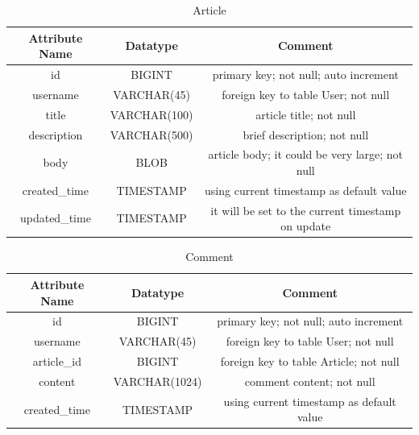 \documentclass[11pt]{homework}
\begin{document}
  \begin{table}[h!]
    \begin{center}
      \caption{Article}
      \label{tab:table2}
      \begin{tabular}{c|c|c} 
        \textbf{Attribute Name} & \textbf{Datatype} & \textbf{Comment}\\
        \hline
        id & BIGINT & primary key; not null; auto increment \\
        username & VARCHAR(45) & foreign key to table User; not null \\
        title & VARCHAR(100) & article title; not null \\
        description & VARCHAR(500) & brief description; not null \\
        body & BLOB & article body; it could be very large; not null \\
        created\_time & TIMESTAMP & using current timestamp as default value \\
        updated\_time & TIMESTAMP & it will be set to the current timestamp on update \\
      \end{tabular}
    \end{center}
  \end{table}

  \begin{table}[h!]
    \begin{center}
      \caption{Comment}
      \label{tab:table3}
      \begin{tabular}{c|c|c} %
        \textbf{Attribute Name} & \textbf{Datatype} & \textbf{Comment}\\
        \hline
        id & BIGINT & primary key; not null; auto increment \\
        username & VARCHAR(45) & foreign key to table User; not null \\
        article\_id & BIGINT & foreign key to table Article; not null \\
        content & VARCHAR(1024) & comment content; not null \\
        created\_time & TIMESTAMP & using current timestamp as default value \\
      \end{tabular}
    \end{center}
  \end{table}
\end{document}
